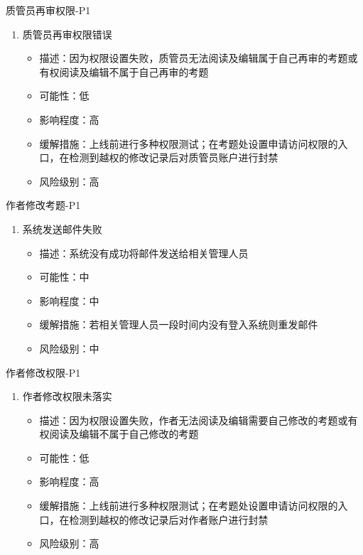 \documentclass[hyperref, a4paper]{ctexart}
\providecommand{\tightlist}{%
  \setlength{\itemsep}{0pt}\setlength{\parskip}{0pt}}
\begin{document}
质管员再审权限-P1

\begin{enumerate}
\def\labelenumi{\arabic{enumi}.}
\tightlist
\item
  质管员再审权限错误

  \begin{itemize}
  \tightlist
  \item
    描述：因为权限设置失败，质管员无法阅读及编辑属于自己再审的考题或有权阅读及编辑不属于自己再审的考题
  \item
    可能性：低
  \item
    影响程度：高
  \item
    缓解措施：上线前进行多种权限测试；在考题处设置申请访问权限的入口，在检测到越权的修改记录后对质管员账户进行封禁
  \item
    风险级别：高
  \end{itemize}
\end{enumerate}

作者修改考题-P1

\begin{enumerate}
\def\labelenumi{\arabic{enumi}.}
\tightlist
\item
  系统发送邮件失败

  \begin{itemize}
  \tightlist
  \item
    描述：系统没有成功将邮件发送给相关管理人员
  \item
    可能性：中
  \item
    影响程度：中
  \item
    缓解措施：若相关管理人员一段时间内没有登入系统则重发邮件
  \item
    风险级别：中
  \end{itemize}
\end{enumerate}

作者修改权限-P1

\begin{enumerate}
\def\labelenumi{\arabic{enumi}.}
\tightlist
\item
  作者修改权限未落实

  \begin{itemize}
  \tightlist
  \item
    描述：因为权限设置失败，作者无法阅读及编辑需要自己修改的考题或有权阅读及编辑不属于自己修改的考题
  \item
    可能性：低
  \item
    影响程度：高
  \item
    缓解措施：上线前进行多种权限测试；在考题处设置申请访问权限的入口，在检测到越权的修改记录后对作者账户进行封禁
  \item
    风险级别：高
  \end{itemize}
\end{enumerate}
\end{document}
